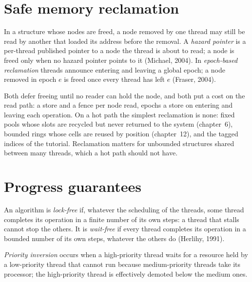 \section{Safe memory reclamation}

\begin{definition}\label{def:ll:lock-free-programming:reclaim}
In a  structure whose nodes are freed, a node removed by one thread may still be read by another that loaded its
address before the removal. A \emph{hazard pointer} is a per-thread published pointer to a node the
thread is about to read; a node is freed only when no hazard pointer points to it (Michael, 2004). In
\emph{epoch-based reclamation} threads announce entering and leaving a global epoch; a node
removed in epoch $e$ is freed once every thread has left $e$ (Fraser, 2004).
\end{definition}

Both defer freeing until no reader can hold the node, and both put a cost on the read path:  a store and a
fence per node read, epochs a store on entering and leaving each operation. On a hot path the simplest reclamation is none:
fixed pools whose slots are recycled but never returned to the system (chapter~6), bounded rings whose cells are reused by
position (chapter~12), and the tagged indices of the tutorial. Reclamation matters for unbounded structures shared between
many threads, which a hot path should not have.

\section{Progress guarantees}

\begin{definition}\label{def:ll:lock-free-programming:progress}
An algorithm is \emph{lock-free} if, whatever the scheduling of the threads, some thread completes its
operation in a finite number of its own steps: a thread that stalls cannot stop the others. It is \emph{wait-free}
if every thread completes its operation in a bounded number of its own steps, whatever the others do (Herlihy, 1991).
\end{definition}

\begin{definition}\label{def:ll:lock-free-programming:inversion}
\emph{Priority inversion} occurs when a high-priority thread waits for a resource held by a
low-priority thread that cannot run because medium-priority threads take its processor; the high-priority thread is
effectively demoted below the medium ones.
\end{definition}

